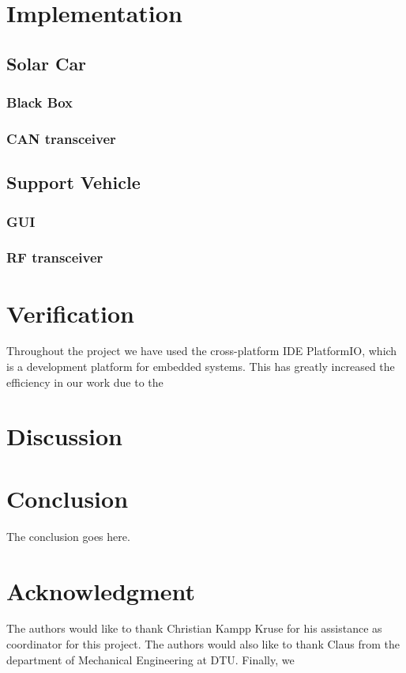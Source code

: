 \documentclass[conference]{IEEEtran}
\begin{document}
\section{Implementation}

\subsection{Solar Car} 
\subsubsection{Black Box} %
\subsubsection{CAN transceiver}
\subsection{Support Vehicle}
\subsubsection{GUI} %
\subsubsection{RF transceiver}

\section{Verification} %
Throughout the project we have used the cross-platform IDE PlatformIO, which is a development platform for embedded systems. This has greatly increased the efficiency in our work due to the 

\section{Discussion}

\section{Conclusion}
The conclusion goes here.


\section*{Acknowledgment}


The authors would like to thank Christian Kampp Kruse for his assistance as coordinator for this project. The authors would also like to thank Claus from the department of Mechanical Engineering at DTU. Finally, we 
\end{document}
